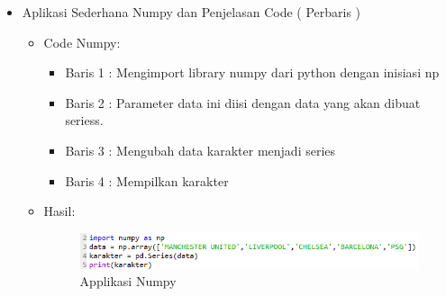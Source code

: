 \begin{enumerate}
\begin{itemize}
\par
\par
\item Aplikasi Sederhana Numpy dan Penjelasan Code ( Perbaris )
\begin{itemize}
\item Code Numpy:
\par 
\par
\begin{itemize}
\item Baris 1 : Mengimport library numpy dari python dengan inisiasi np
\par
\item Baris 2 : Parameter data ini diisi dengan data yang akan dibuat seriess.
\par
\item Baris 3 : Mengubah data karakter menjadi series
\par
\item Baris 4 : Mempilkan karakter
\par
\end{itemize}
\item Hasil:
\par
\par
\begin{figure}[ht]
\centering
\includegraphics[scale=0.8]{figures/hmm/2.png}
\caption{Applikasi Numpy}
\label{contoh}
\end{figure}
\par
\par


\end{itemize}
\end{itemize}
\end{enumerate}

